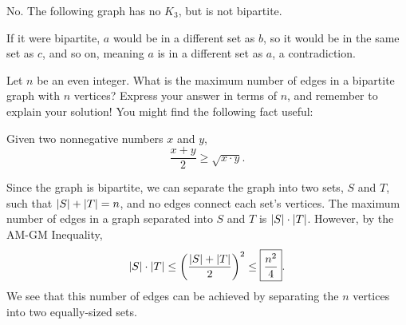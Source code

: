 \documentclass[11pt]{article}
\begin{document}
\begin{solution}
No. The following graph has no $K_3$, but is not bipartite.
\begin{center}
\end{center}
If it were bipartite, $a$ would be in a different set as $b$, so it would be in the same set as $c$, and so on, meaning $a$ is in a different set as $a$, a contradiction.
\end{solution}

\begin{problem}[4 points] %
Let $n$ be an even integer. What is the maximum number of edges in a bipartite graph with $n$ vertices? Express your answer
in terms of $n$, and remember to explain your solution! You might find the following fact useful:
\begin{theorem}[AM-GM]
\label{thm:am-gm}
Given two nonnegative numbers $x$ and $y$,
\[\frac{x + y}{2} \ge \sqrt{x \cdot y}.\]
\end{theorem}
\end{problem}

\begin{solution}
Since the graph is bipartite, we can separate the graph into two sets, $S$ and $T$, such that $\left\lvert S \right\rvert + \left\lvert T \right\rvert = n$,
and no edges connect each set's vertices. The maximum number of edges in a graph separated into $S$ and $T$ is $\left\lvert S \right\rvert \cdot \left\lvert T \right\rvert$. However, by the
AM-GM Inequality,
\[\left\lvert S \right\rvert \cdot \left\lvert T \right\rvert \le \left(\frac{\left\lvert S \right\rvert + \left\lvert T \right\rvert}{2}\right)^2 \le \boxed{\frac{n^2}{4}}. \]
We see that this number of edges can be achieved by separating the $n$ vertices into two equally-sized sets.
\end{solution}
\end{document}
